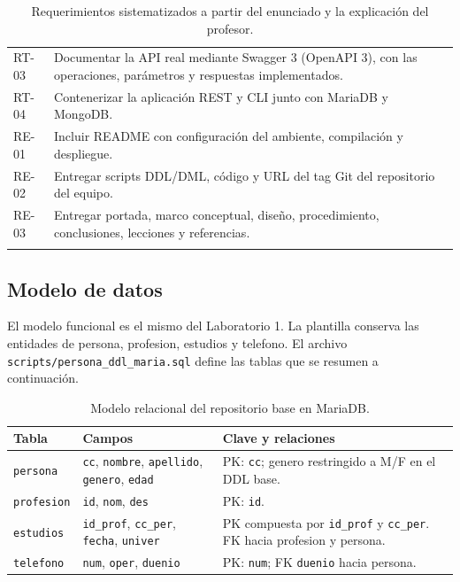 \documentclass[11pt,a4paper]{article}
\begin{document}
\begin{longtable}{@{}p{1.8cm}p{11.9cm}@{}}
RT-03 & Documentar la API real mediante Swagger 3 (OpenAPI 3), con las operaciones, parámetros y respuestas implementados.\\
RT-04 & Contenerizar la aplicación REST y CLI junto con MariaDB y MongoDB.\\
RE-01 & Incluir README con configuración del ambiente, compilación y despliegue.\\
RE-02 & Entregar scripts DDL/DML, código y URL del tag Git del repositorio del equipo.\\
RE-03 & Entregar portada, marco conceptual, diseño, procedimiento, conclusiones, lecciones y referencias.\\
\bottomrule
\caption{Requerimientos sistematizados a partir del enunciado y la explicación del profesor.}
\end{longtable}

\subsection{Modelo de datos}
El modelo funcional es el mismo del Laboratorio 1. La plantilla conserva
las entidades de persona, profesion, estudios y telefono. El archivo
\texttt{scripts/persona\_ddl\_maria.sql} define las tablas que se resumen
a continuación.

\begin{table}[H]
\centering\small
\begin{tabularx}{\textwidth}{@{}p{2.2cm}p{5.2cm}X@{}}
\toprule
\textbf{Tabla}&\textbf{Campos}&\textbf{Clave y relaciones}\\\midrule
\texttt{persona}&\texttt{cc}, \texttt{nombre}, \texttt{apellido}, \texttt{genero}, \texttt{edad}&PK: \texttt{cc}; genero restringido a M/F en el DDL base.\\
\texttt{profesion}&\texttt{id}, \texttt{nom}, \texttt{des}&PK: \texttt{id}.\\
\texttt{estudios}&\texttt{id\_prof}, \texttt{cc\_per}, \texttt{fecha}, \texttt{univer}&PK compuesta por \texttt{id\_prof} y \texttt{cc\_per}. FK hacia profesion y persona.\\
\texttt{telefono}&\texttt{num}, \texttt{oper}, \texttt{duenio}&PK: \texttt{num}; FK \texttt{duenio} hacia persona.\\
\bottomrule
\end{tabularx}
\caption{Modelo relacional del repositorio base en MariaDB.}
\end{table}
\end{document}
